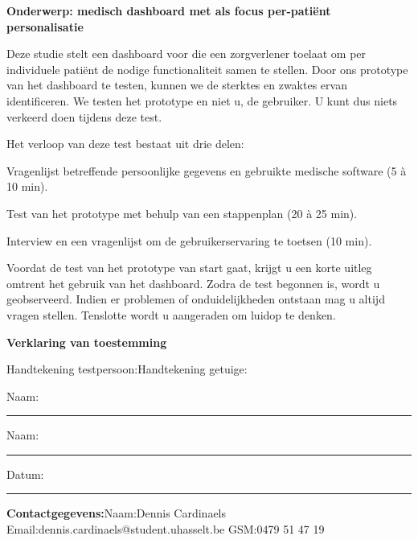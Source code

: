     \noindent\textbf{Onderwerp: medisch dashboard met als focus per-pati\"{e}nt personalisatie}\bigskip

    \noindent Deze studie stelt een dashboard voor die een zorgverlener toelaat om per individuele pati\"{e}nt de nodige functionaliteit samen te stellen. Door ons prototype van het dashboard te testen, kunnen we de sterktes en zwaktes ervan identificeren. We testen het prototype en niet u, de gebruiker. U kunt dus niets verkeerd doen tijdens deze test.\bigskip

    \noindent Het verloop van deze test bestaat uit drie delen:
    \vspace{-\topsep}
    \begin{myenumerate}
        \item Vragenlijst betreffende persoonlijke gegevens en gebruikte medische software (5 \`{a} 10 min).
        \item Test van het prototype met behulp van een stappenplan (20 \`{a} 25 min).
        \item Interview en een vragenlijst om de gebruikerservaring te toetsen (10 min).
    \end{myenumerate}

    \noindent Voordat de test van het prototype van start gaat, krijgt u een korte uitleg omtrent het gebruik van het dashboard. Zodra de test begonnen is, wordt u geobserveerd. Indien er problemen of onduidelijkheden ontstaan mag u altijd vragen stellen. Tenslotte wordt u aangeraden om luidop te denken.\bigskip

    \noindent\textbf{Verklaring van toestemming}\bigskip

    \noindent Handtekening testpersoon:\quad\quad\quad\quad\quad\quad\quad Handtekening getuige:\bigskip\bigskip

    \noindent Naam: \rule{0.29\textwidth}{0.4pt} \quad\quad\quad\quad\quad Naam: \rule{0.29\textwidth}{0.4pt}\medskip

    \noindent Datum: \rule{0.15\textwidth}{0.4pt}\medskip

    \noindent\textbf{Contactgegevens:}\quad Naam:\hspace{10pt}Dennis Cardinaels\newline
    \hspace*{97pt}Email:\hspace{10pt}dennis.cardinaels@student.uhasselt.be\newline
    \hspace*{97pt}GSM\@:\hspace{13pt}0479 51 47 19

